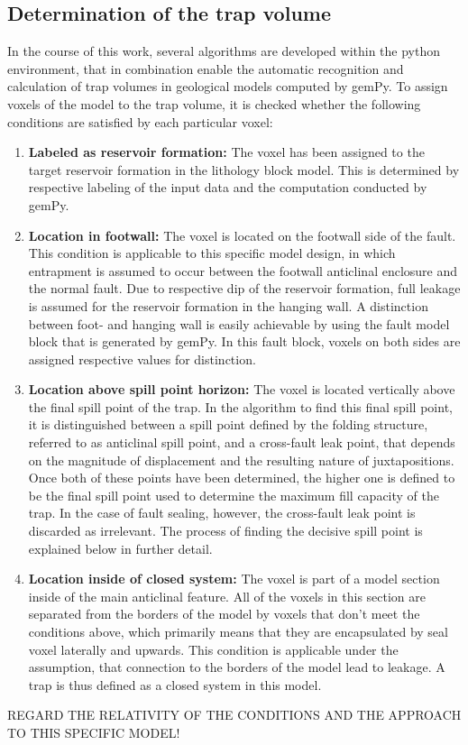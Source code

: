 		\subsection{Determination of the trap volume}
		In the course of this work, several algorithms are developed within the python environment, that in combination enable the automatic recognition and calculation of trap volumes in geological models computed by gemPy. To assign voxels of the model to the trap volume, it is checked whether the following conditions are satisfied by each particular voxel: 
		\begin{enumerate}
				        \item \textbf{Labeled as reservoir formation:} The voxel has been assigned to the target reservoir formation in the lithology block model. This is determined by respective labeling of the input data and the computation conducted by gemPy.
				        \item \textbf{Location in footwall:} The voxel is located on the footwall side of the fault. This condition is applicable to this specific model design, in which entrapment is assumed to occur between the footwall anticlinal enclosure and the normal fault. Due to respective dip of the reservoir formation, full leakage is assumed for the reservoir formation in the hanging wall. A distinction between foot- and hanging wall is easily achievable by using the fault model block that is generated by gemPy. In this fault block, voxels on both sides are assigned respective values for distinction.
				        \item \textbf{Location above spill point horizon:} The voxel is located vertically above the final spill point of the trap. In the algorithm to find this final spill point, it is distinguished between a spill point defined by the folding structure, referred to as anticlinal spill point, and a cross-fault leak point, that depends on the magnitude of displacement and the resulting nature of juxtapositions. Once both of these points have been determined, the higher one is defined to be the final spill point used to determine the maximum fill capacity of the trap. In the case of fault sealing, however, the cross-fault leak point is discarded as irrelevant. The process of finding the decisive spill point is explained below in further detail.
				        \item \textbf{Location inside of closed system:} The voxel is part of a model section inside of the main anticlinal feature. All of the voxels in this section are separated from the borders of the model by voxels that don't meet the conditions above, which primarily means that they are encapsulated by seal voxel laterally and upwards. This condition is applicable  under the assumption, that connection to the borders of the model lead to leakage. A trap is thus defined as a closed system in this model.
		\end{enumerate} 
		REGARD THE RELATIVITY OF THE CONDITIONS AND THE APPROACH TO THIS SPECIFIC MODEL!
		
